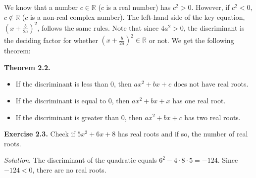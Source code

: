 \documentclass{article}
\begin{document}
We know that a number $c \in \mathbb{R}$ ($c$ is a real number) has $c^2>0$. However, if $c^2<0$, $c \not\in \mathbb{R}$ ($c$ is a non-real complex number). The left-hand side of the key equation, $(x+\frac{b}{2a})^2$, follows the same rules. Note that since $4a^2 > 0$, the discriminant is the deciding factor for whether $(x+\frac{b}{2a})^2 \in \mathbb{R}$ or not. We get the following theorem:\\

\begin{mdframed}
    \textbf{Theorem 2.2.}
    \begin{itemize}
        \item If the discriminant is less than 0, then $ax^2+bx+c$ does not have real roots.
        \item If the discriminant is equal to 0, then $ax^2+bx+x$ has one real root.
        \item If the discriminant is greater than 0, then $ax^2+bx+c$ has two real roots.
    \end{itemize}
\end{mdframed}

\begin{mdframed}
  \textbf{Exercise 2.3.} Check if $5x^2+6x+8$ has real roots and if so, the number of real roots.
\end{mdframed}
\emph{Solution}. The discriminant of the quadratic equals $6^2-4\cdot8\cdot5 = -124$. Since $-124 < 0$, there are no real roots.
\end{document}
